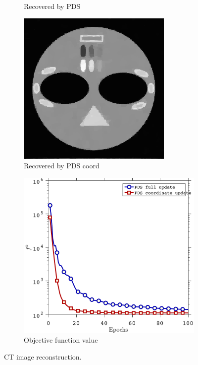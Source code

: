\begin{figure}[!htb]
\begin{subfigure}{0.45\linewidth}
         \caption{Recovered by PDS}\label{fig:pds_b}                    
    \end{subfigure} %
    \begin{subfigure}{0.45\linewidth}
        \centering
        \includegraphics[width=0.9\linewidth]{./figs/new_fig_pds_coord_img}
         \caption{Recovered by PDS coord}\label{fig:pds_c}                      
    \end{subfigure} %
    \quad
    \begin{subfigure}{0.45\linewidth}
        \centering
        \includegraphics[width=\linewidth]{./figs/new_fig_func_val}
         \caption{Objective function value}\label{fig:pds_d}                            
    \end{subfigure} %
    \caption{CT image reconstruction.}
    \label{fig:pds_results}
\end{figure}


